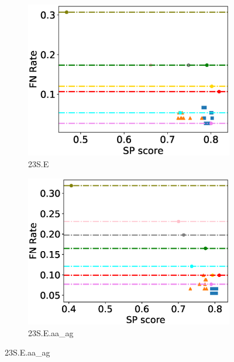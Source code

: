 \begin{figure}[!htbp]
\begin{adjustwidth}{-0.5cm}{-0.5cm}
\begin{subfigure}{0.26\textwidth}
			\includegraphics[width=\columnwidth]{Figure/summary/precomputedInit/23S.E/fnrate_vs_sp}
			\caption{23S.E}
		\end{subfigure}    
		\begin{subfigure}{0.26\textwidth}
			\includegraphics[width=\columnwidth]{Figure/summary/precomputedInit/23S.E.aa_ag/fnrate_vs_sp}
			\caption{23S.E.aa\_ag}
		\end{subfigure}
	

\end{adjustwidth}
\end{figure}

